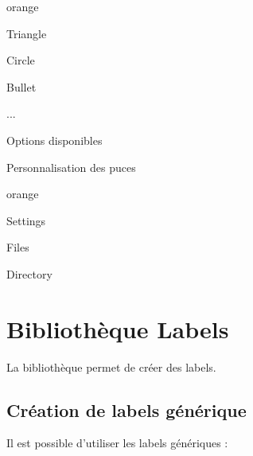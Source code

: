 {\begin{items}{orange}{\Triangle}
    \item Triangle
    \item Circle
    \item Bullet
    \item \faGear
    \item \faFileText
    \item ...
\end{items}

\begin{Latex}{Options disponibles}
\Triangle
\Bullet 
\Circle
\faGear
\faFileText
\end{Latex}


\begin{Latex}{Personnalisation des puces}
    \begin{items}{orange}{\faFileText}
        \item Settings
        \item Files
        \item Directory
    \end{items}
\end{Latex}


\chapter{Bibliothèque Labels} \label{Labels}

La bibliothèque  permet de créer des labels.

\section{Création de labels générique}

Il est possible d'utiliser les labels génériques : \\


}
